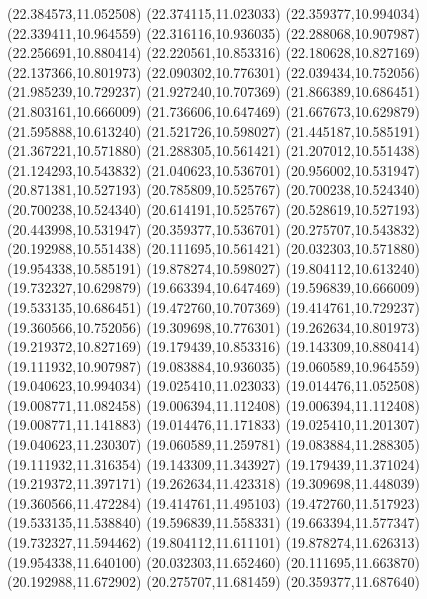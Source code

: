 {{\lineto(22.384573,11.052508)
\lineto(22.374115,11.023033)
\lineto(22.359377,10.994034)
\lineto(22.339411,10.964559)
\lineto(22.316116,10.936035)
\lineto(22.288068,10.907987)
\lineto(22.256691,10.880414)
\lineto(22.220561,10.853316)
\lineto(22.180628,10.827169)
\lineto(22.137366,10.801973)
\lineto(22.090302,10.776301)
\lineto(22.039434,10.752056)
\lineto(21.985239,10.729237)
\lineto(21.927240,10.707369)
\lineto(21.866389,10.686451)
\lineto(21.803161,10.666009)
\lineto(21.736606,10.647469)
\lineto(21.667673,10.629879)
\lineto(21.595888,10.613240)
\lineto(21.521726,10.598027)
\lineto(21.445187,10.585191)
\lineto(21.367221,10.571880)
\lineto(21.288305,10.561421)
\lineto(21.207012,10.551438)
\lineto(21.124293,10.543832)
\lineto(21.040623,10.536701)
\lineto(20.956002,10.531947)
\lineto(20.871381,10.527193)
\lineto(20.785809,10.525767)
\lineto(20.700238,10.524340)
\lineto(20.700238,10.524340)
\lineto(20.614191,10.525767)
\lineto(20.528619,10.527193)
\lineto(20.443998,10.531947)
\lineto(20.359377,10.536701)
\lineto(20.275707,10.543832)
\lineto(20.192988,10.551438)
\lineto(20.111695,10.561421)
\lineto(20.032303,10.571880)
\lineto(19.954338,10.585191)
\lineto(19.878274,10.598027)
\lineto(19.804112,10.613240)
\lineto(19.732327,10.629879)
\lineto(19.663394,10.647469)
\lineto(19.596839,10.666009)
\lineto(19.533135,10.686451)
\lineto(19.472760,10.707369)
\lineto(19.414761,10.729237)
\lineto(19.360566,10.752056)
\lineto(19.309698,10.776301)
\lineto(19.262634,10.801973)
\lineto(19.219372,10.827169)
\lineto(19.179439,10.853316)
\lineto(19.143309,10.880414)
\lineto(19.111932,10.907987)
\lineto(19.083884,10.936035)
\lineto(19.060589,10.964559)
\lineto(19.040623,10.994034)
\lineto(19.025410,11.023033)
\lineto(19.014476,11.052508)
\lineto(19.008771,11.082458)
\lineto(19.006394,11.112408)
\lineto(19.006394,11.112408)
\lineto(19.008771,11.141883)
\lineto(19.014476,11.171833)
\lineto(19.025410,11.201307)
\lineto(19.040623,11.230307)
\lineto(19.060589,11.259781)
\lineto(19.083884,11.288305)
\lineto(19.111932,11.316354)
\lineto(19.143309,11.343927)
\lineto(19.179439,11.371024)
\lineto(19.219372,11.397171)
\lineto(19.262634,11.423318)
\lineto(19.309698,11.448039)
\lineto(19.360566,11.472284)
\lineto(19.414761,11.495103)
\lineto(19.472760,11.517923)
\lineto(19.533135,11.538840)
\lineto(19.596839,11.558331)
\lineto(19.663394,11.577347)
\lineto(19.732327,11.594462)
\lineto(19.804112,11.611101)
\lineto(19.878274,11.626313)
\lineto(19.954338,11.640100)
\lineto(20.032303,11.652460)
\lineto(20.111695,11.663870)
\lineto(20.192988,11.672902)
\lineto(20.275707,11.681459)
\lineto(20.359377,11.687640)
}}
